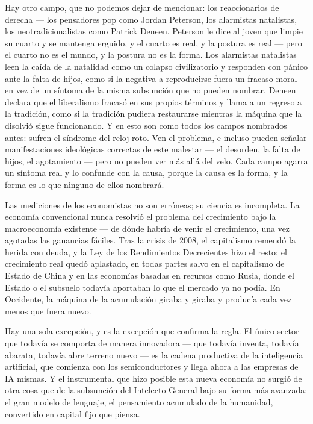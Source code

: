\documentclass[11pt]{article}
\begin{document}
Hay otro campo, que no podemos dejar de mencionar: los reaccionarios de
derecha --- los pensadores pop como Jordan Peterson, los alarmistas
natalistas, los neotradicionalistas como Patrick Deneen. Peterson le
dice al joven que limpie su cuarto y se mantenga erguido, y el cuarto
es real, y la postura es real --- pero el cuarto no es el mundo, y la
postura no es la forma. Los alarmistas natalistas leen la caída de la
natalidad como un colapso civilizatorio y responden con pánico ante la
falta de hijos, como si la negativa a reproducirse fuera un fracaso
moral en vez de un síntoma de la misma subsunción que no pueden nombrar.
Deneen declara que el liberalismo fracasó en sus propios términos y
llama a un regreso a la tradición, como si la tradición pudiera
restaurarse mientras la máquina que la disolvió sigue funcionando. Y en
esto son como todos los campos nombrados antes: sufren el síndrome del
reloj roto. Ven el problema, e incluso pueden señalar manifestaciones
ideológicas correctas de este malestar --- el desorden, la falta de
hijos, el agotamiento --- pero no pueden ver más allá del velo. Cada
campo agarra un síntoma real y lo confunde con la causa, porque la
causa es la forma, y la forma es lo que ninguno de ellos nombrará.

Las mediciones de los economistas no son erróneas; su ciencia es
incompleta. La economía convencional nunca resolvió el problema del
crecimiento bajo la macroeconomía existente --- de dónde habría de venir
el crecimiento, una vez agotadas las ganancias fáciles. Tras la crisis
de 2008, el capitalismo remendó la herida con deuda, y la Ley de los
Rendimientos Decrecientes hizo el resto: el crecimiento real quedó
aplastado, en todas partes salvo en el capitalismo de Estado de China y
en las economías basadas en recursos como Rusia, donde el Estado o el
subsuelo todavía aportaban lo que el mercado ya no podía. En Occidente,
la máquina de la acumulación giraba y giraba y producía cada vez menos
que fuera nuevo.

Hay una sola excepción, y es la excepción que confirma la regla. El
único sector que todavía se comporta de manera innovadora --- que
todavía inventa, todavía abarata, todavía abre terreno nuevo --- es la
cadena productiva de la inteligencia artificial, que comienza con los
semiconductores y llega ahora a las empresas de IA mismas. Y el
instrumental que hizo posible esta nueva economía no surgió de otra
cosa que de la subsunción del Intelecto General bajo su forma más
avanzada: el gran modelo de lenguaje, el pensamiento acumulado de la
humanidad, convertido en capital fijo que piensa.
\end{document}
